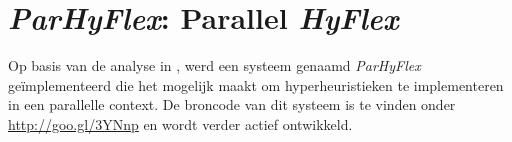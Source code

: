 \chapter{\emph{ParHyFlex}: Parallel \emph{HyFlex}}


Op basis van de analyse in , werd een systeem genaamd \emph{ParHyFlex} ge\"implementeerd die het mogelijk maakt om hyperheuristieken te implementeren in een parallelle context. De broncode van dit systeem is te vinden onder \mbox{\url{http://goo.gl/3YNnp}} en wordt verder actief ontwikkeld.




